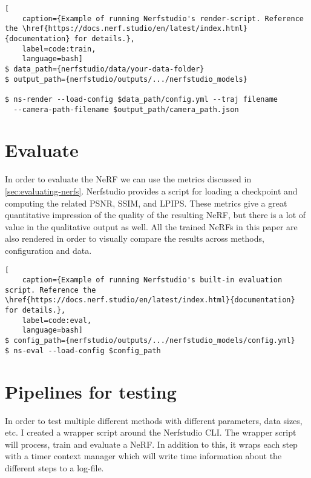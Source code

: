 
\begin{lstlisting}[
    caption={Example of running Nerfstudio's render-script. Reference the \href{https://docs.nerf.studio/en/latest/index.html}{documentation} for details.},
    label=code:train,
    language=bash]
$ data_path={nerfstudio/data/your-data-folder}
$ output_path={nerfstudio/outputs/.../nerfstudio_models}

$ ns-render --load-config $data_path/config.yml --traj filename 
  --camera-path-filename $output_path/camera_path.json
\end{lstlisting}




\section{Evaluate}
In order to evaluate the NeRF we can use the metrics discussed in \autoref{sec:evaluating-nerfs}. Nerfstudio provides a script for loading a checkpoint and computing the related PSNR, SSIM, and LPIPS. These metrics give a great quantitative impression of the quality of the resulting NeRF, but there is a lot of value in the qualitative output as well. All the trained NeRFs in this paper are also rendered in order to visually compare the results across methods, configuration and data.

\begin{lstlisting}[
    caption={Example of running Nerfstudio's built-in evaluation script. Reference the \href{https://docs.nerf.studio/en/latest/index.html}{documentation} for details.},
    label=code:eval,
    language=bash]
$ config_path={nerfstudio/outputs/.../nerfstudio_models/config.yml}
$ ns-eval --load-config $config_path
\end{lstlisting}


\section{Pipelines for testing}
In order to test multiple different methods with different parameters, data sizes, etc. I created a wrapper script around the Nerfstudio CLI. The wrapper script will process, train and evaluate a NeRF. In addition to this, it wraps each step with a timer context manager which will write time information about the different steps to a log-file.


